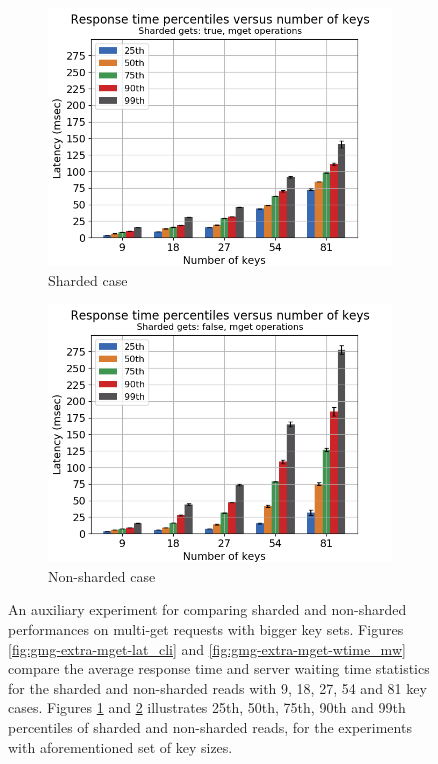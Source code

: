\documentclass[11pt,a4paper]{article}
\begin{document}
\begin{figure}[h]
\begin{subfigure}{.5\textwidth}
  \centering
  \includegraphics[width=1.0\linewidth ,trim={5px 0px 20px 0px},clip]{img/plot/gmg-extra-perc-mget-true.png}
  \caption{Sharded case}
  \label{fig:gmg-extra-perc-mget-true}
\end{subfigure}%
\begin{subfigure}{.5\textwidth}
  \centering
  \includegraphics[width=1.0\linewidth ,trim={5px 0px 20px 0px},clip]{img/plot/gmg-extra-perc-mget-false.png}
  \caption{Non-sharded case}
  \label{fig:gmg-extra-perc-mget-false}
\end{subfigure}
\caption{An auxiliary experiment for comparing sharded and non-sharded performances on multi-get requests with bigger key sets. Figures \ref{fig:gmg-extra-mget-lat_cli} and \ref{fig:gmg-extra-mget-wtime_mw} compare the average response time and server waiting time statistics for the sharded and non-sharded reads with 9, 18, 27, 54 and 81 key cases. Figures \ref{fig:gmg-extra-perc-mget-true} and \ref{fig:gmg-extra-perc-mget-false} illustrates 25th, 50th, 75th, 90th and 99th percentiles of sharded and non-sharded reads, for the experiments with aforementioned set of key sizes.}
\label{fig:gmg-extra}
\end{figure}
\end{document}
